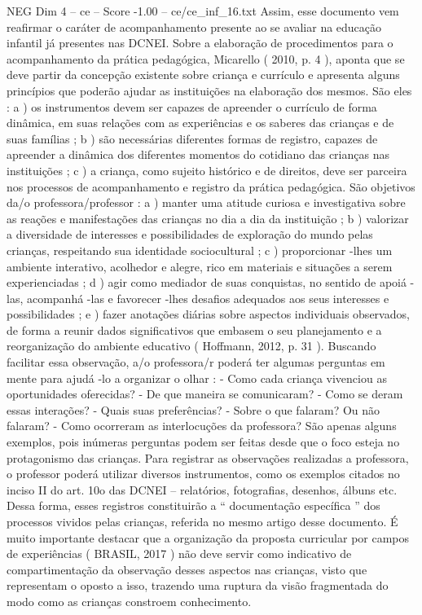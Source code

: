 \begin{textsample}{NEG Dim 4 – ce – Score -1.00 – ce/ce\_inf\_16.txt}
Assim, esse documento vem reafirmar o caráter de acompanhamento presente ao se avaliar na educação infantil já presentes nas DCNEI.
Sobre a elaboração de procedimentos para o acompanhamento da prática pedagógica, Micarello ( 2010, p. 4 ), aponta que se deve partir da concepção existente sobre criança e currículo e apresenta alguns princípios que poderão ajudar as instituições na elaboração dos mesmos.
São eles : a ) os instrumentos devem ser capazes de apreender o currículo de forma dinâmica, em suas relações com as experiências e os saberes das crianças e de suas famílias ; b ) são necessárias diferentes formas de registro, capazes de apreender a dinâmica dos diferentes momentos do cotidiano das crianças nas instituições ; c ) a criança, como sujeito histórico e de direitos, deve ser parceira nos processos de acompanhamento e registro da prática pedagógica.
São objetivos da/o professora/professor : a ) manter uma atitude curiosa e investigativa sobre as reações e manifestações das crianças no dia a dia da instituição ; b ) valorizar a diversidade de interesses e possibilidades de exploração do mundo pelas crianças, respeitando sua identidade sociocultural ; c ) proporcionar -lhes um ambiente interativo, acolhedor e alegre, rico em materiais e situações a serem experienciadas ; d ) agir como mediador de suas conquistas, no sentido de apoiá -las, acompanhá -las e favorecer -lhes desafios adequados aos seus interesses e possibilidades ; e ) fazer anotações diárias sobre aspectos individuais observados, de forma a reunir dados significativos que embasem o seu planejamento e a reorganização do ambiente educativo ( Hoffmann, 2012, p. 31 ).
Buscando facilitar essa observação, a/o professora/r poderá ter algumas perguntas em mente para ajudá -lo a organizar o olhar : - Como cada criança vivenciou as oportunidades oferecidas? - De que maneira se comunicaram? - Como se deram essas interações? - Quais suas preferências? - Sobre o que falaram?
Ou não falaram? - Como ocorreram as interlocuções da professora?
São apenas alguns exemplos, pois inúmeras perguntas podem ser feitas desde que o foco esteja no protagonismo das crianças.
Para registrar as observações realizadas a professora, o professor poderá utilizar diversos instrumentos, como os exemplos citados no inciso II do art. 10o das DCNEI – relatórios, fotografias, desenhos, álbuns etc.
Dessa forma, esses registros constituirão a “ documentação específica ” dos processos vividos pelas crianças, referida no mesmo artigo desse documento.
É muito importante destacar que a organização da proposta curricular por campos de experiências ( BRASIL, 2017 ) não deve servir como indicativo de compartimentação da observação desses aspectos nas crianças, visto que representam o oposto a isso, trazendo uma ruptura da visão fragmentada do modo como as crianças constroem conhecimento.

\end{textsample}
